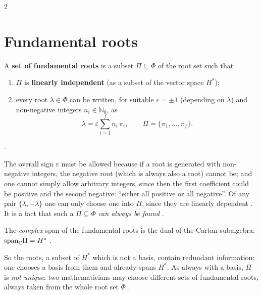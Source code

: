 \begin{paracol}{2}
\section{Fundamental roots}\label{sec:cl-fundamental}

\begin{definition}\label{def:cl-fundamental}
A \textbf{set of fundamental roots} is a subset $\Pi\subseteq\Phi$ of the root set such that
\begin{enumerate}
  \item[(a)] $\Pi$ is \textbf{linearly independent} (as a subset of the vector space $H^*$);
  \item[(b)] every root $\lambda\in\Phi$ can be written, for suitable $\varepsilon=\pm1$ (depending on $\lambda$) and non-negative integers $n_i\in\mathbb N_0$, as
  \[
    \lambda=\varepsilon\sum_{i=1}^{f}n_i\,\pi_i,\qquad\Pi=\{\pi_1,\dots,\pi_f\}.
  \]
\end{enumerate}
         .
\end{definition}
The overall sign $\varepsilon$ must be allowed because if a root is generated with non-negative integers, the negative root (which is always also a root) cannot be; and one cannot simply allow arbitrary integers, since then the first coefficient could be positive and the second negative: ``either all positive or all negative''. Of any pair $\{\lambda,-\lambda\}$ one can only choose one into $\Pi$, since they are linearly dependent    . It is a fact that such a $\Pi\subseteq\Phi$ \emph{can always be found}  .
\begin{theorem}[$\Pi$ spans $H^*$]\label{thm:cl-span}
The \emph{complex} span of the fundamental roots is the dual of the Cartan subalgebra: $\mathrm{span}_{\mathbb{C}}\Pi=H^*$   .
\end{theorem}
So the roots, a subset of $H^*$ which is not a basis, contain redundant information; one chooses a basis from them and already spans $H^*$. As always with a basis, $\Pi$ is \emph{not unique}: two mathematicians may choose different sets of fundamental roots, always taken from the whole root set $\Phi$   .


\end{paracol}

